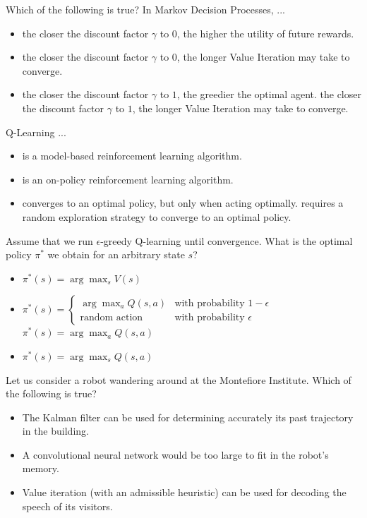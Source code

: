 \documentclass[11pt, a4paper]{article}
\begin{document}
\startquiz
Which of the following is true? In Markov Decision Processes, ...
\begin{itemize}
    \item the closer the discount factor $\gamma$ to $0$, the higher the utility of future rewards.
    \item the closer the discount factor $\gamma$ to $0$, the longer Value Iteration may take to converge. 
    \item the closer the discount factor $\gamma$ to $1$, the greedier the optimal agent. 
    \solitem the closer the discount factor $\gamma$ to $1$, the longer Value Iteration may take to converge.  %
\end{itemize}
Q-Learning ...
\begin{itemize}
    \item is a model-based reinforcement learning algorithm.
    \item is an on-policy reinforcement learning algorithm.
    \item converges to an optimal policy, but only when acting optimally.
    \solitem requires a random exploration strategy to converge to an optimal policy. %
\end{itemize}
Assume that we run $\epsilon$-greedy Q-learning until convergence. What is the optimal policy $\pi^*$ we obtain for an arbitrary state $s$?
\begin{itemize}
    \item $\pi^*(s) = \arg\max_s V(s)$
    \item $\pi^*(s) = \begin{cases}
        \arg\max_a Q(s,a) & \text{with probability $1-\epsilon$}\\
        \text{random action} & \text{with probability $\epsilon$}
    \end{cases}$
    \solitem $\pi^*(s) = \arg\max_a Q(s,a)$ %
    \item $\pi^*(s) = \arg\max_s Q(s,a)$
\end{itemize}
Let us consider a robot wandering around at the Montefiore Institute. Which of the following is true?
\begin{itemize}
    \solitem The robot and its environment can be modeled as a partially observable MDP. %
    \item The Kalman filter can be used for determining accurately its past trajectory in the building. 
    \item A convolutional neural network would be too large to fit in the robot's memory.
    \item Value iteration (with an admissible heuristic) can be used for decoding the speech of its visitors.
\end{itemize}
\end{document}
